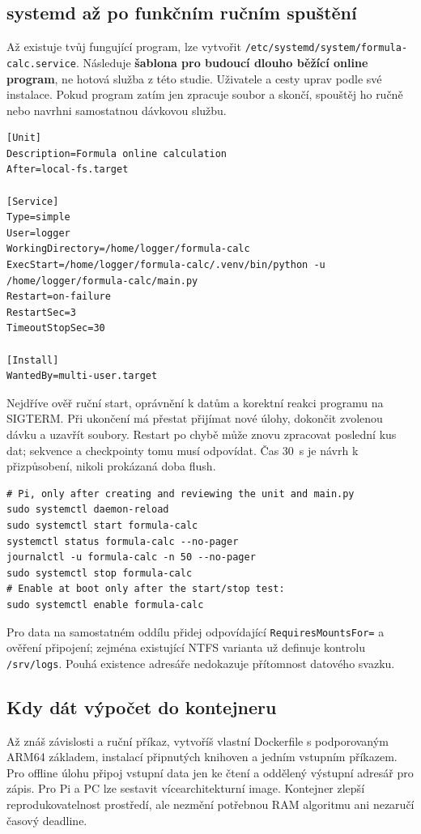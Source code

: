 \documentclass[11pt,a4paper]{article}
\begin{document}
\subsection{systemd až po funkčním ručním spuštění}
Až existuje tvůj fungující program, lze vytvořit \texttt{/etc/systemd/system/formula-calc.service}. Následuje \textbf{šablona pro budoucí dlouho běžící online program}, ne hotová služba z této studie. Uživatele a cesty uprav podle své instalace. Pokud program zatím jen zpracuje soubor a skončí, spouštěj ho ručně nebo navrhni samostatnou dávkovou službu.
\begin{lstlisting}
[Unit]
Description=Formula online calculation
After=local-fs.target

[Service]
Type=simple
User=logger
WorkingDirectory=/home/logger/formula-calc
ExecStart=/home/logger/formula-calc/.venv/bin/python -u /home/logger/formula-calc/main.py
Restart=on-failure
RestartSec=3
TimeoutStopSec=30

[Install]
WantedBy=multi-user.target
\end{lstlisting}
Nejdříve ověř ruční start, oprávnění k datům a korektní reakci programu na SIGTERM. Při ukončení má přestat přijímat nové úlohy, dokončit zvolenou dávku a uzavřít soubory. Restart po chybě může znovu zpracovat poslední kus dat; sekvence a checkpointy tomu musí odpovídat. Čas 30~s je návrh k přizpůsobení, nikoli prokázaná doba flush.\cite{systemd}
\begin{lstlisting}
# Pi, only after creating and reviewing the unit and main.py
sudo systemctl daemon-reload
sudo systemctl start formula-calc
systemctl status formula-calc --no-pager
journalctl -u formula-calc -n 50 --no-pager
sudo systemctl stop formula-calc
# Enable at boot only after the start/stop test:
sudo systemctl enable formula-calc
\end{lstlisting}
Pro data na samostatném oddílu přidej odpovídající \texttt{RequiresMountsFor=} a ověření připojení; zejména existující NTFS varianta už definuje kontrolu \texttt{/srv/logs}. Pouhá existence adresáře nedokazuje přítomnost datového svazku.

\subsection{Kdy dát výpočet do kontejneru}
Až znáš závislosti a ruční příkaz, vytvoříš vlastní Dockerfile s podporovaným ARM64 základem, instalací připnutých knihoven a jedním vstupním příkazem. Pro offline úlohu připoj vstupní data jen ke čtení a oddělený výstupní adresář pro zápis. Pro Pi a PC lze sestavit vícearchitekturní image. Kontejner zlepší reprodukovatelnost prostředí, ale nezmění potřebnou RAM algoritmu ani nezaručí časový deadline.\cite{docker-build}
\end{document}

